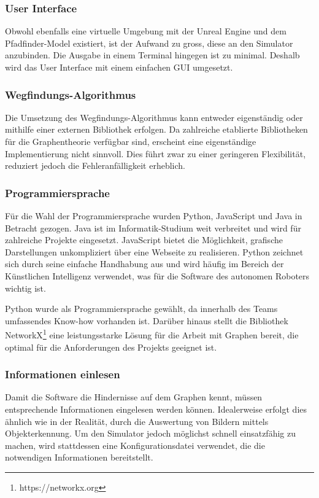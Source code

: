 \documentclass[../main.tex]{subfiles}
\begin{document}
\subsubsection{User Interface}

Obwohl ebenfalls eine virtuelle Umgebung mit der Unreal Engine und dem Pfadfinder-Model existiert, ist der Aufwand zu gross, diese an den Simulator anzubinden. Die Ausgabe in einem Terminal hingegen ist zu minimal. Deshalb wird das User Interface mit einem einfachen GUI umgesetzt. 

\subsubsection{Wegfindungs-Algorithmus}

Die Umsetzung des Wegfindungs-Algorithmus kann entweder eigenständig oder mithilfe einer externen Bibliothek erfolgen. Da zahlreiche etablierte Bibliotheken für die Graphentheorie verfügbar sind, erscheint eine eigenständige Implementierung nicht sinnvoll. Dies führt zwar zu einer geringeren Flexibilität, reduziert jedoch die Fehleranfälligkeit erheblich.

\subsubsection{Programmiersprache}

Für die Wahl der Programmiersprache wurden Python, JavaScript und Java in Betracht gezogen. Java ist im Informatik-Studium weit verbreitet und wird für zahlreiche Projekte eingesetzt. JavaScript bietet die Möglichkeit, grafische Darstellungen unkompliziert über eine Webseite zu realisieren. Python zeichnet sich durch seine einfache Handhabung aus und wird häufig im Bereich der Künstlichen Intelligenz verwendet, was für die Software des autonomen Roboters wichtig ist.

Python wurde als Programmiersprache gewählt, da innerhalb des Teams umfassendes Know-how vorhanden ist. Darüber hinaus stellt die Bibliothek NetworkX\footnote{https://networkx.org} eine leistungsstarke Lösung für die Arbeit mit Graphen bereit, die optimal für die Anforderungen des Projekts geeignet ist.

\subsubsection{Informationen einlesen}

Damit die Software die Hindernisse auf dem Graphen kennt, müssen entsprechende Informationen eingelesen werden können. Idealerweise erfolgt dies ähnlich wie in der Realität, durch die Auswertung von Bildern mittels Objekterkennung. Um den Simulator jedoch möglichst schnell einsatzfähig zu machen, wird stattdessen eine Konfigurationsdatei verwendet, die die notwendigen Informationen bereitstellt.
\end{document}
